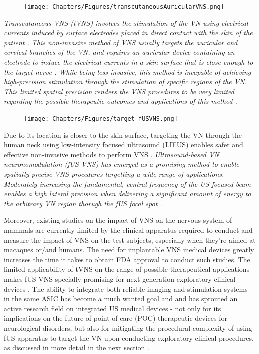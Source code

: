 \begin{figure}[ht]
  \centering
  \texttt{[image: Chapters/Figures/transcutaneousAuricularVNS.png]}
  \label{fig:transcutaneous_electrode_vns}
\end{figure}

\it{Transcutaneous VNS (tVNS)} involves the stimulation of the VN using electrical currents induced by surface electrodes placed in direct contact with the skin of the patient \cite{}. This non-invasive method of VNS usually targets the auricular and cervical branches of the VN, and requires an auricular device containing an electrode to induce the electrical currents in a skin surface that is close enough to the target nerve \cite{}.
While being less invasive, this method is incapable of achieving high-precision stimulation through the stimulation of specific regions of the VN. This limited spatial precision renders the VNS procedures to be very limited regarding the possible therapeutic outcomes and applications of this method \cite{}.

\begin{figure}[ht]
  \centering
  \texttt{[image: Chapters/Figures/target\_fUSVNS.png]}
  \label{fig:fus_vns}
\end{figure}

Due to its location is closer to the skin surface, targeting the VN through
the human neck using low-intensity focused ultrasound (LIFUS) enables safer and
effective non-invasive methods to perform VNS \cite{Fomenko2018, Rivandi2023, Costa2021, Costa2019}.
\it{Ultrasound-based VN neuronomodulation (fUS-VNS)} has emerged as a promising method to enable spatially precise VNS procedures targetting a wide range of applications. 
Moderately increasing the fundamental, central frequency of the US focused beam 
enables a high lateral precision when delivering a significant amount of energy to the 
arbitrary VN region thorugh the fUS focal spot \cite{}.

Moreover, existing studies on the impact of VNS on the nervous system of mammals are currently limited by the clinical apparatus required to conduct and measure the impact of VNS on the test subjects, especially when they're aimed at macaques or/and humans. The need for implantable VNS medical devices greatly increases the time it takes to obtain FDA approval to conduct such studies. The limited applicability of tVNS on the range of possible therapeutical applications makes fUS-VNS specially promising for next generation exploratory clinical devices \cite{}. The ability to integrate both reliable imaging and stimulation systems in the same ASIC has become a much wanted goal and and has sprouted an active research field on integrated US medical devices - not only for its implications on the future of point-of-care (POC) therapeutic devices for neurological disorders, but also for mitigating the procedural complexity of using fUS apparatus to target the VN upon conducting exploratory clinical procedures, as discussed in more detail in the next section \cite{}.

